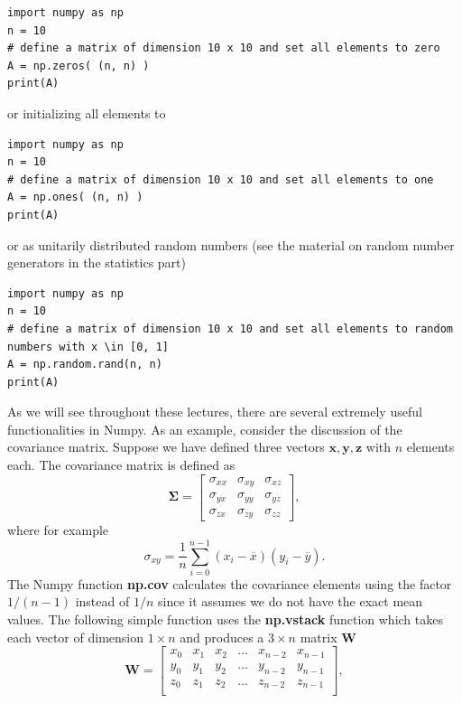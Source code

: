 \documentclass{beamer}
\begin{document}
\begin{frame}
\begin{verbatim}
import numpy as np
n = 10
# define a matrix of dimension 10 x 10 and set all elements to zero
A = np.zeros( (n, n) )
print(A) 

\end{verbatim}

or initializing all elements to 






\begin{verbatim}
import numpy as np
n = 10
# define a matrix of dimension 10 x 10 and set all elements to one
A = np.ones( (n, n) )
print(A) 

\end{verbatim}

or as unitarily distributed random numbers (see the material on random number generators in the statistics part)






\begin{verbatim}
import numpy as np
n = 10
# define a matrix of dimension 10 x 10 and set all elements to random numbers with x \in [0, 1]
A = np.random.rand(n, n)
print(A) 

\end{verbatim}


As we will see throughout these lectures, there are several extremely useful functionalities in Numpy.
As an example, consider the discussion of the covariance matrix. Suppose we have defined three vectors
$\bm{x}, \bm{y}, \bm{z}$ with $n$ elements each. The covariance matrix is defined as 
\[
\bm{\Sigma} = \begin{bmatrix} \sigma_{xx} & \sigma_{xy} & \sigma_{xz} \\
                              \sigma_{yx} & \sigma_{yy} & \sigma_{yz} \\
                              \sigma_{zx} & \sigma_{zy} & \sigma_{zz} 
             \end{bmatrix},
\]
where for example
\[
\sigma_{xy} =\frac{1}{n} \sum_{i=0}^{n-1}(x_i- \overline{x})(y_i- \overline{y}).
\]
The Numpy function \textbf{np.cov} calculates the covariance elements using the factor $1/(n-1)$ instead of $1/n$ since it assumes we do not have the exact mean values. 
The following simple function uses the \textbf{np.vstack} function which takes each vector of dimension $1\times n$ and produces a $3\times n$ matrix $\bm{W}$
\[
\bm{W} = \begin{bmatrix} x_0 & x_1 & x_2 & \dots & x_{n-2} & x_{n-1} \\
                         y_0 & y_1 & y_2 & \dots & y_{n-2} & y_{n-1} \\
			 z_0 & z_1 & z_2 & \dots & z_{n-2} & z_{n-1} \\
             \end{bmatrix},
\]


\end{frame}
\end{document}
